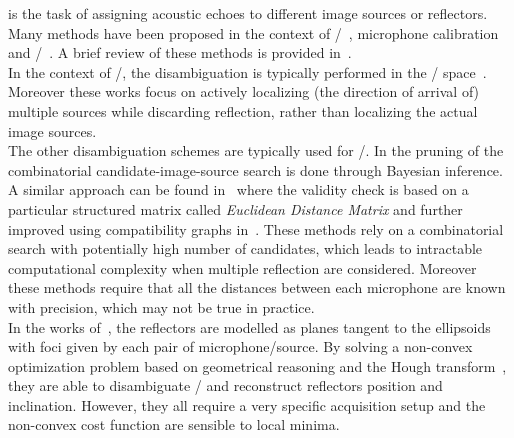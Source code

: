  is the task of assigning acoustic echoes to different image sources or reflectors.
Many methods have been proposed in the context of \SSL/~, microphone calibration~
and \RooGE/~.
A brief review of these methods is provided in~.
\\In the context of \SSL/, the disambiguation is typically performed in the \TDOAs/ space~.
Moreover these works focus on actively localizing (the direction of arrival of) multiple sources while discarding reflection, rather than localizing the actual image sources.
\\The other disambiguation schemes are typically used for \RooGE/.
In  the pruning of the combinatorial candidate-image-source search is done through Bayesian inference.
A similar approach can be found in~ where the validity check is based on a particular structured matrix called \textit{Euclidean Distance Matrix} and further improved using compatibility graphs in~.
These methods rely on a combinatorial search with potentially high number of candidates, which leads to intractable computational complexity when multiple reflection are considered.
Moreover these methods require that all the distances between each microphone are known with precision, which may not be true in practice.
\\In the works of~, the reflectors are modelled as planes tangent to the ellipsoids with foci given by each pair of microphone/source.
By solving a non-convex optimization problem based on geometrical reasoning and the Hough transform~, they are able to disambiguate \TOAs/ and reconstruct reflectors position and inclination.
However, they all require a very specific acquisition setup and the non-convex cost function are sensible to local minima.

